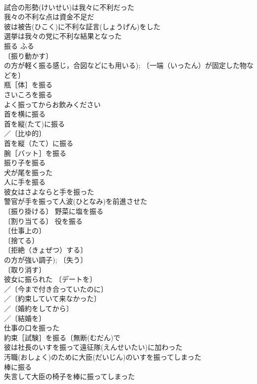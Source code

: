 \documentclass[8pt]{extreport}
\begin{document}
\begin{CJK}{UTF8}{min}
\\	試合の形勢(けいせい)は我々に不利だった 
\\	我々の不利な点は資金不足だ 
\\	彼は被告(ひこく)に不利な証言(しょうげん)をした 
\\	選挙は我々の党に不利な結果となった 
\\	振る	ふる	
\\	〔振り動かす〕
\\	の方が軽く振る感じ，合図などにも用いる); 〔一端（いったん）が固定した物などを〕
\\	瓶［体］を振る 
\\	さいころを振る 
\\	よく振ってからお飲みください 
\\	首を横に振る 
\\	首を縦(たて)に振る 
\\	／〔比ゆ的〕
\\	首を縦（たて）に振る 
\\	腕［バット］を振る 
\\	振り子を振る 
\\	犬が尾を振った 
\\	人に手を振る 
\\	彼女はさよならと手を振った 
\\	警官が手を振って人波(ひとなみ)を前進させた 
\\	〔振り掛ける〕 野菜に塩を振る 
\\	〔割り当てる〕 役を振る 
\\	〔仕事上の〕
\\	〔捨てる〕
\\	〔拒絶（きょぜつ）する〕
\\	の方が強い調子); 〔失う〕
\\	〔取り消す〕
\\	彼女に振られた 〔デートを〕
\\	／〔今まで付き合っていたのに〕
\\	／〔約束していて来なかった〕
\\	／〔婚約をしてから〕
\\	／〔結婚を〕
\\	仕事の口を振った 
\\	約束［試験］を振る〔無断(むだん)で　
\\	彼は社長のいすを振って遠征隊(えんせいたい)に加わった 
\\	汚職(おしょく)のために大臣(だいじん)のいすを振ってしまった 
\\	棒に振る　
\\	失言して大臣の椅子を棒に振ってしまった 

\end{CJK}
\end{document}
